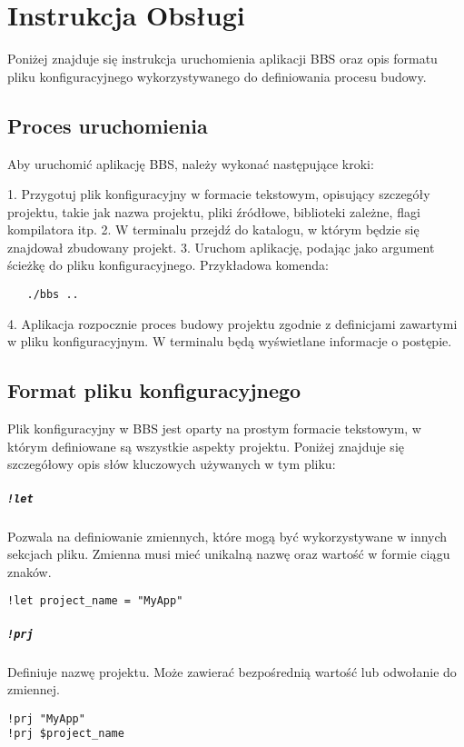 \chapter{Instrukcja Obsługi}

Poniżej znajduje się instrukcja uruchomienia aplikacji BBS oraz opis formatu pliku konfiguracyjnego wykorzystywanego do definiowania procesu budowy.

\section{Proces uruchomienia}

Aby uruchomić aplikację BBS, należy wykonać następujące kroki:

1. Przygotuj plik konfiguracyjny w formacie tekstowym, opisujący szczegóły projektu, takie jak nazwa projektu, pliki źródłowe, biblioteki zależne, flagi kompilatora itp.
2. W terminalu przejdź do katalogu, w którym będzie się znajdował zbudowany projekt.
3. Uruchom aplikację, podając jako argument ścieżkę do pliku konfiguracyjnego. Przykładowa komenda:
   \begin{verbatim}
   ./bbs ..
   \end{verbatim}
4. Aplikacja rozpocznie proces budowy projektu zgodnie z definicjami zawartymi w pliku konfiguracyjnym. W terminalu będą wyświetlane informacje o postępie.

\section{Format pliku konfiguracyjnego}

Plik konfiguracyjny w BBS jest oparty na prostym formacie tekstowym, w którym definiowane są wszystkie aspekty projektu. Poniżej znajduje się szczegółowy opis słów kluczowych używanych w tym pliku:

\paragraph{\texttt{!let}} Pozwala na definiowanie zmiennych, które mogą być wykorzystywane w innych sekcjach pliku. Zmienna musi mieć unikalną nazwę oraz wartość w formie ciągu znaków.
\begin{verbatim}
!let project_name = "MyApp"
\end{verbatim}

\paragraph{\texttt{!prj}} Definiuje nazwę projektu. Może zawierać bezpośrednią wartość lub odwołanie do zmiennej.
\begin{verbatim}
!prj "MyApp"
!prj $project_name
\end{verbatim}

